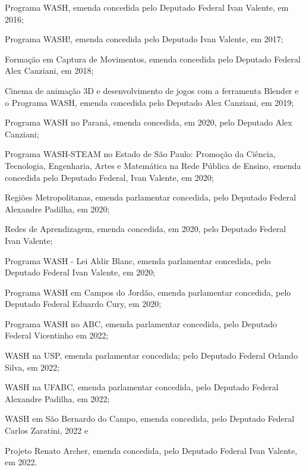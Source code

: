 \documentclass[
12pt,		%
openright,	%
twoside,  %
a4paper,			%
chapter=TITLE,		%
english,			%
french,				%
spanish,			%
brazil				%
]{USPSC-classe/USPSC}
\begin{document}
\begin{alineas}
\item \textquotedbl Programa WASH\textquotedbl , emenda concedida pelo Deputado Federal Ivan Valente, em 2016;
\item \textquotedbl Programa WASH!\textquotedbl , emenda concedida pelo Deputado Ivan Valente, em 2017;
\item \textquotedbl Forma\c{c}\~ao em Captura de Movimentos\textquotedbl , emenda concedida pelo Deputado Federal Alex Canziani, em 2018;
\item \textquotedbl Cinema de anima\c{c}\~ao 3D e desenvolvimento de jogos com a ferramenta Blender e o Programa WASH\textquotedbl , emenda concedida pelo Deputado Alex Canziani, em 2019;
\item \textquotedbl Programa WASH no Paran\'a\textquotedbl , emenda concedida, em 2020, pelo Deputado Alex Canziani;
\item \textquotedbl Programa WASH-STEAM no Estado de S\~ao Paulo: Promo\c{c}\~ao da Ci\^encia, Tecnologia, Engenharia, Artes  e Matem\'atica na Rede P\'ublica de Ensino\textquotedbl , emenda concedida pelo Deputado Federal, Ivan Valente, em 2020;
\item \textquotedbl Regi\~oes Metropolitanas\textquotedbl , emenda parlamentar concedida, pelo Deputado Federal Alexandre Padilha, em 2020;
\item \textquotedbl Redes de Aprendizagem\textquotedbl , emenda concedida, em 2020, pelo Deputado Federal Ivan Valente;
\item \textquotedbl Programa WASH - Lei Aldir Blanc\textquotedbl , emenda parlamentar concedida, pelo Deputado Federal  Ivan Valente, em 2020;
\item \textquotedbl Programa WASH em Campos do Jord\~ao\textquotedbl , emenda parlamentar concedida, pelo Deputado Federal Eduardo Cury, em 2020;
\item \textquotedbl Programa WASH no ABC\textquotedbl , emenda parlamentar concedida, pelo Deputado Federal Vicentinho em 2022;
\item \textquotedbl WASH na USP\textquotedbl , emenda parlamentar concedida; pelo Deputado Federal Orlando Silva, em 2022;
\item \textquotedbl WASH na UFABC\textquotedbl , emenda parlamentar concedida, pelo Deputado Federal Alexandre Padilha, em 2022;
\item \textquotedbl WASH em S\~ao Bernardo do Campo\textquotedbl , emenda concedida, pelo Deputado Federal Carlos Zaratini, 2022 e
\item \textquotedbl Projeto Renato Archer\textquotedbl , emenda concedida, pelo Deputado Federal Ivan Valente, em 2022.
\end{alineas}
\end{document}
